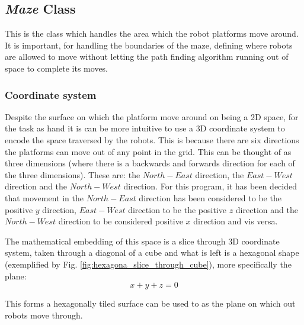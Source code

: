 \subsection{\textit{Maze} Class}


This is the class which handles the area which the robot platforms move around.
It is important, for handling the boundaries of the maze, defining where robots are allowed to move without letting the path finding algorithm running out of space to complete its moves.

\subsubsection{Coordinate system}

Despite the surface on which the platform move around on being a 2D space, for the task as hand it is can be more intuitive to use a 3D coordinate system to encode the space traversed by the robots. This is because there are six directions the platforms can move out of any point in the grid. This can be thought of as three dimensions (where there is a backwards and forwards direction for each of the three dimensions). These are: the $North-East$ direction, the $East-West$ direction and the $North-West$ direction.
For this program, it has been decided that movement in the $North-East$ direction has been considered to be the positive $y$ direction, $East-West$ direction to be the positive $z$ direction and the $North-West$ direction to be considered positive $x$ direction and vis versa.

The mathematical embedding of this space is a slice through 3D coordinate system, taken through a diagonal of a cube and what is left is a hexagonal shape (exemplified by Fig. \ref{fig:hexagona_slice_through_cube}), more specifically the plane:
$$x + y + z = 0$$
 
This forms a hexagonally tiled surface can be used to as the plane on which out robots move through.

